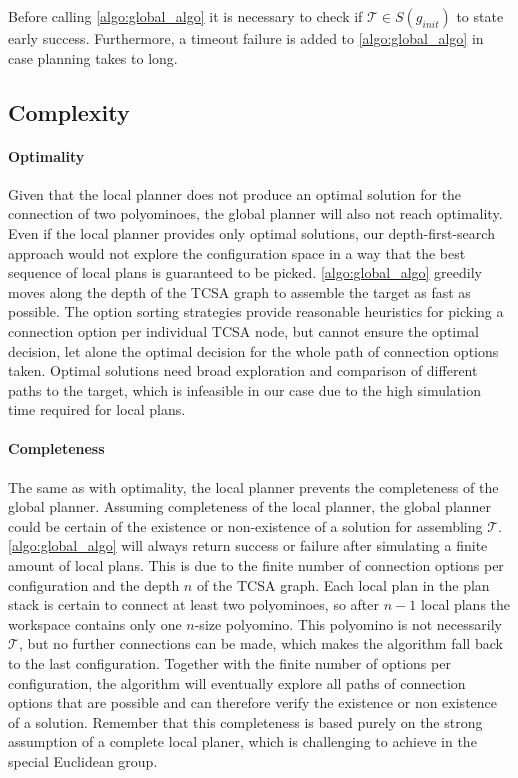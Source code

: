 Before calling \autoref{algo:global_algo} it is necessary to check if $\mathcal{T} \in S(g_\textit{init})$ to state early success.
Furthermore, a timeout failure is added to \autoref{algo:global_algo} in case planning takes to long.
 
\subsection{Complexity}
\label{sec:global_complex}

\paragraph{Optimality}

Given that the local planner does not produce an optimal solution for the connection of two polyominoes, the global planner will also not reach optimality.
Even if the local planner provides only optimal solutions, our depth-first-search approach would not explore the configuration space in a way that the best sequence of local plans is guaranteed to be picked.
\autoref{algo:global_algo} greedily moves along the depth of the TCSA graph to assemble the target as fast as possible.
The option sorting strategies provide reasonable heuristics for picking a connection option per individual TCSA node, but cannot ensure the optimal decision, let alone the optimal decision for the whole path of connection options taken.
Optimal solutions need broad exploration and comparison of different paths to the target, which is infeasible in our case due to the high simulation time required for local plans.

\paragraph{Completeness}

The same as with optimality, the local planner prevents the completeness of the global planner.
Assuming completeness of the local planner, the global planner could be certain of the existence or non-existence of a solution for assembling $\mathcal{T}$.
\autoref{algo:global_algo} will always return success or failure after simulating a finite amount of local plans.
This is due to the finite number of connection options per configuration and the depth $n$ of the TCSA graph.
Each local plan in the plan stack is certain to connect at least two polyominoes, so after $n-1$ local plans the workspace contains only one $n$-size polyomino.
This polyomino is not necessarily $\mathcal{T}$, but no further connections can be made, which makes the algorithm fall back to the last configuration.
Together with the finite number of options per configuration, the algorithm will eventually explore all paths of connection options that are possible and can therefore verify the existence or non existence of a solution.
Remember that this completeness is based purely on the strong assumption of a complete local planer, which is challenging to achieve in the special Euclidean group.

